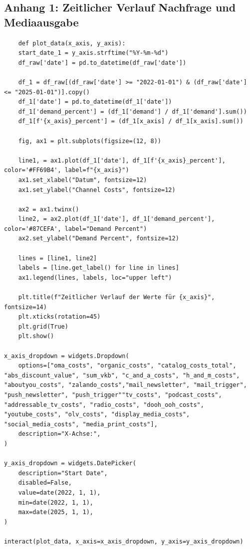 \documentclass{common/nak}
\numberwithin{equation}{subsection}
\begin{document}
\subsection*{Anhang 1: Zeitlicher Verlauf Nachfrage und Mediaausgabe}
\label{Anhang1:ZeitlicherVerlaufMitPywidgets}
\UseRawInputEncoding
\begin{lstlisting}
    def plot_data(x_axis, y_axis):
    start_date_1 = y_axis.strftime("%Y-%m-%d")
    df_raw['date'] = pd.to_datetime(df_raw['date'])
    
    df_1 = df_raw[(df_raw['date'] >= "2022-01-01") & (df_raw['date'] <= "2025-01-01")].copy() 
    df_1['date'] = pd.to_datetime(df_1['date'])
    df_1['demand_percent'] = (df_1['demand'] / df_1['demand'].sum())
    df_1[f'{x_axis}_percent'] = (df_1[x_axis] / df_1[x_axis].sum())
    
    fig, ax1 = plt.subplots(figsize=(12, 8))
    
    line1, = ax1.plot(df_1['date'], df_1[f'{x_axis}_percent'], color='#FF69B4', label=f"{x_axis}")
    ax1.set_xlabel("Datum", fontsize=12)
    ax1.set_ylabel("Channel Costs", fontsize=12)
    
    ax2 = ax1.twinx()
    line2, = ax2.plot(df_1['date'], df_1['demand_percent'], color='#87CEFA', label="Demand Percent")
    ax2.set_ylabel("Demand Percent", fontsize=12)
    
    lines = [line1, line2]
    labels = [line.get_label() for line in lines]
    ax1.legend(lines, labels, loc="upper left")
    
    plt.title(f"Zeitlicher Verlauf der Werte für {x_axis}", fontsize=14)
    plt.xticks(rotation=45)
    plt.grid(True)
    plt.show()

x_axis_dropdown = widgets.Dropdown(
    options=["oma_costs", "organic_costs", "catalog_costs_total", "abs_discount_value", "sum_vkb", "c_and_a_costs", "h_and_m_costs", "aboutyou_costs", "zalando_costs","mail_newsletter", "mail_trigger", "push_newsletter", "push_trigger""tv_costs", "podcast_costs", "addressable_tv_costs", "radio_costs", "dooh_ooh_costs", "youtube_costs", "olv_costs", "display_media_costs", "social_media_costs", "media_print_costs"],
    description="X-Achse:",
)

y_axis_dropdown = widgets.DatePicker(
    description="Start Date",
    disabled=False,
    value=date(2022, 1, 1),
    min=date(2022, 1, 1),  
    max=date(2025, 1, 1),
)

interact(plot_data, x_axis=x_axis_dropdown, y_axis=y_axis_dropdown)
\end{lstlisting}
\newpage
\end{document}
